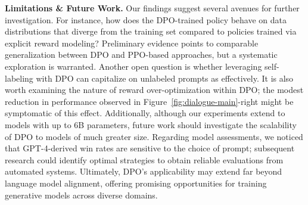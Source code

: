 \textbf{Limitations \& Future Work.} Our findings suggest several avenues for further investigation. For instance, how does the DPO-trained policy behave on data distributions that diverge from the training set compared to policies trained via explicit reward modeling? Preliminary evidence points to comparable generalization between DPO and PPO-based approaches, but a systematic exploration is warranted. Another open question is whether leveraging self-labeling with DPO can capitalize on unlabeled prompts as effectively. It is also worth examining the nature of reward over-optimization within DPO; the modest reduction in performance observed in Figure~\ref{fig:dialogue-main}-right might be symptomatic of this effect. Additionally, although our experiments extend to models with up to 6B parameters, future work should investigate the scalability of DPO to models of much greater size. Regarding model assessments, we noticed that GPT-4-derived win rates are sensitive to the choice of prompt; subsequent research could identify optimal strategies to obtain reliable evaluations from automated systems. Ultimately, DPO's applicability may extend far beyond language model alignment, offering promising opportunities for training generative models across diverse domains.
